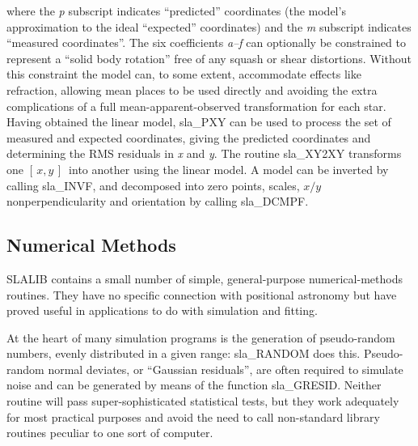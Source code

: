 \documentclass[11pt,twoside,nolof]{starlink}
\providecommand{\xy}        {$[\,x,y\,]$}
\begin{document}
where the \textit{p}\/ subscript indicates ``predicted'' coordinates
(the model's approximation to the ideal ``expected'' coordinates) and the
\textit{m}\/ subscript indicates ``measured coordinates''.  The
six coefficients \textit{a--f}\/ can optionally be
constrained to represent a ``solid body rotation'' free of
any squash or shear distortions.  Without this constraint
the model can, to some extent, accommodate effects like refraction,
allowing mean places to be used directly and
avoiding the extra complications of a
full mean-apparent-observed transformation for each star.
Having obtained the linear model,
sla\_PXY
can be used to process the set of measured and expected
coordinates, giving the predicted coordinates and determining
the RMS residuals in \textit{x}\/ and \textit{y}.
The routine
sla\_XY2XY
transforms one \xy\ into another using the linear model.  A model
can be inverted by calling
sla\_INVF,
and decomposed into zero points, scales, $x/y$ nonperpendicularity
and orientation by calling
sla\_DCMPF.

\subsection{Numerical Methods}
SLALIB contains a small number of simple, general-purpose
numerical-methods routines.  They have no specific
connection with positional astronomy but have proved useful in
applications to do with simulation and fitting.

At the heart of many simulation programs is the generation of
pseudo-random numbers, evenly distributed in a given range:
sla\_RANDOM
does this.  Pseudo-random normal deviates, or ``Gaussian
residuals'', are often required to simulate noise and
can be generated by means of the function
sla\_GRESID.
Neither routine will pass super-sophisticated
statistical tests, but they work adequately for most
practical purposes and avoid the need to call non-standard
library routines peculiar to one sort of computer.
\end{document}
